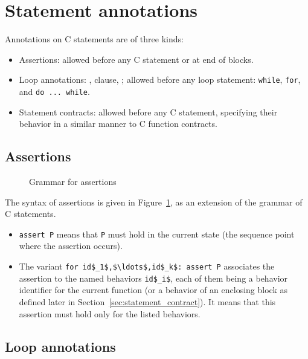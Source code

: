 \section{Statement annotations}

Annotations on C statements are of three kinds:
\begin{itemize}
\item Assertions: allowed before any C statement or
  at end of blocks.
\item{}
  Loop annotations: \invariant, \assigns clause, \variant; allowed
  before any loop statement: \lstinline|while|, \lstinline|for|, and
  \lstinline|do ... while|.
\item{}
  Statement contracts: allowed before any C statement, specifying
  their behavior in a similar manner to C function contracts.
\end{itemize}

\subsection{Assertions}
\label{sec:assertions}
\begin{figure}[t]
  \begin{cadre}
    
  \end{cadre}
  \caption{Grammar for assertions}
  \label{fig:gram:assertions}
\end{figure}

The syntax of assertions is given in Figure~\ref{fig:gram:assertions},
as an extension of the grammar of C statements.

\begin{itemize}
\item
  \lstinline|assert P|  means that \lstinline|P| must hold in the current state
  (the sequence point where the assertion occurs).

\item The variant \lstinline|for id$_1$,$\ldots$,id$_k$: assert P|
  associates the assertion to the named behaviors \lstinline|id$_i$|, each
  of them being a behavior identifier for the current function (or a
  behavior of an enclosing block as defined later in
  Section~\ref{sec:statement_contract}).  It means that this assertion
  must hold only for the listed behaviors.
\end{itemize}

\subsection{Loop annotations}
\label{sec:loop_annot}

